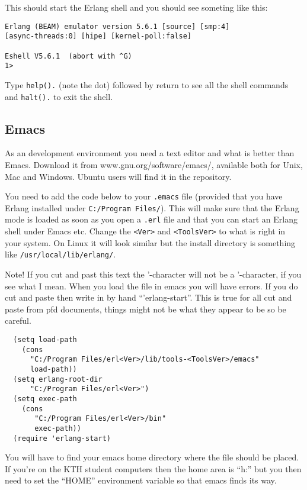 \documentclass[a4paper, 11pt]{article}
\begin{document}
\noindent This should start the Erlang shell and you should see someting like this:

\begin{verbatim}
Erlang (BEAM) emulator version 5.6.1 [source] [smp:4] 
[async-threads:0] [hipe] [kernel-poll:false]

Eshell V5.6.1  (abort with ^G)
1>  
\end{verbatim}

\noindent Type {\tt help().} (note the dot) followed by return to see all the
shell commands and {\tt halt().} to exit the shell.


\subsection{Emacs}

As an development environment you need a text editor and what is
better than Emacs. Download it from www.gnu.org/software/emacs/,
available both for Unix, Mac and Windows. Ubuntu users will find it in
the repository.

You need to add the code below to your {\tt .emacs} file (provided
that you have Erlang installed under {\tt C:/Program Files/}). This
will make sure that the Erlang mode is loaded as soon as you open a
{\tt .erl} file and that you can start an Erlang shell under Emacs
etc. Change the {\tt <Ver>} and {\tt <ToolsVer>} to what is right in
your system. On Linux it will look similar but the install
directory is something like {\tt /usr/local/lib/erlang/}.

Note! If you cut and past this text the '-character will not be a
'-character, if you see what I mean. When you load the file in emacs
you will have errors. If you do cut and paste then write in by hand
``'erlang-start''. This is true for all cut and paste from pfd
documents, things might not be what they appear to be so be careful.

\begin{verbatim}
  (setq load-path 
    (cons  
      "C:/Program Files/erl<Ver>/lib/tools-<ToolsVer>/emacs" 
      load-path))
  (setq erlang-root-dir 
      "C:/Program Files/erl<Ver>")
  (setq exec-path 
    (cons 
       "C:/Program Files/erl<Ver>/bin" 
       exec-path))
  (require 'erlang-start)
\end{verbatim}

\noindent You will have to find your emacs home directory where the file should
be placed. If you're on the KTH student computers then the home area
is ``h:'' but you then need to set the ``HOME'' environment variable
so that emacs finds its way. 
\end{document}
